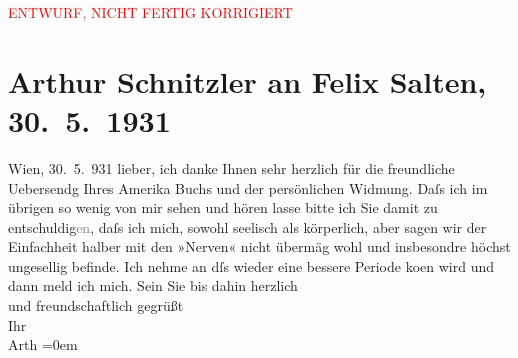 
\begin{center}
            \textcolor{red}{ENTWURF, NICHT FERTIG KORRIGIERT}
                      \end{center}
            
         
         \newcommand{\erwaehntePersonen}{Personen: Felix Salten}
         \newcommand{\erwaehnteInstitutionen}{}
         \newcommand{\erwaehnteOrte}{Orte: Amerika, Wien}
         \newcommand{\erwaehnteWerke}{Werke: Fünf Minuten Amerika}
               \section[Arthur Schnitzler an Felix Salten, 30. 5. 1931]{ Arthur Schnitzler an Felix Salten, 30. 5. 1931}\nopagebreak{}\rehead{ }\begin{ledgroupsized}[t]{13cm}\normalsize\beginnumbering \toendnotes[C]{\smallbreak\pagebreak[2]} 
\toendnotes[C]{\smallbreak}\pstart
           \raggedleft{}{\pb}Wien, 30. 5. 931\pend
           \pstart
           lieber, ich danke Ihnen sehr herzlich für die freundliche Uebersendg
               Ihres 
                  Amerika Buchs und der persönlichen Widmung. Daſs ich im übrigen
               so wenig von mir sehen und hören lasse bitte ich Sie damit zu
                  entschuldig\textcolor{gray}{en}, daſs ich mich, sowohl seelisch als körperlich,
               aber sagen wir der Einfachheit halber mit den »Nerven« nicht übermäg wohl und
               insbesondre höchst ungesellig befinde. Ich nehme an dſs wieder {\pb}eine
               bessere Periode ko{\geminationm}en wird und dann meld ich mich. \pend
           \pstart
           Sein Sie bis dahin herzlich {\\[\baselineskip]}und freundschaftlich gegrüßt {\\[\baselineskip]}Ihr {\\[\baselineskip]}\spacefill\mbox{Arth}\pend
           \leftskip=0em{}
         
         \endnumbering{}\end{ledgroupsized}\begin{anhang}\end{anhang}\newcommand{\dateiname}{L03026}\newcommand{\titel}{Arthur Schnitzler an Felix Salten, 30. 5. 1931}\newcommand{\editorInnen}{Martin Anton Müller und Laura Untner}
      